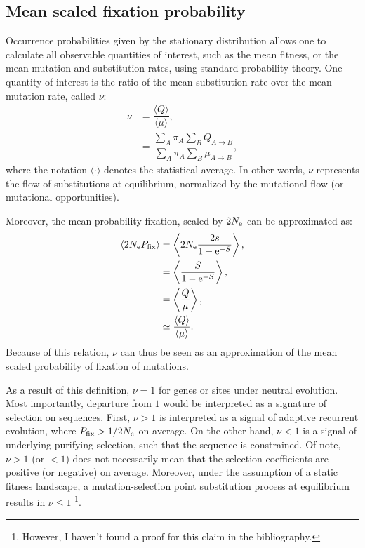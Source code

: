 \subsection{Mean scaled fixation probability}
\label{subsec:mean-scaled-fixation-probability}

Occurrence probabilities given by the stationary distribution allows one to calculate all observable quantities of interest, such as the mean fitness, or the mean mutation and \gls{substitution} rates, using standard probability theory.
One quantity of interest is the ratio of the mean \gls{substitution} rate over the mean mutation rate, called $ \nu $:
\begin{align}
    \nu & = \dfrac{ \langle Q \rangle }{\langle \mu \rangle},
    \label{eq:relative-sub-rate} \\
    & = \dfrac{ \sum\limits_{A} \pi_{A} \sum\limits_{B} Q_{A \to B}}{\sum\limits_{A} \pi_{A}  \sum\limits_{B} \mu_{A \to B}},
\end{align}
where the notation $\langle \cdot \rangle$ denotes the statistical average.
In other words, $ \nu $ represents the flow of substitutions at equilibrium, normalized by the mutational flow (or mutational opportunities).

Moreover, the mean probability fixation, scaled by $2 N_{\textrm{e}}$ can be approximated as:
\begin{align}
    \langle  2N_{\textrm{e}} P_{\mathrm{fix}} \rangle & = \left\langle 2N_{\textrm{e}} \dfrac{ 2 s }{1 - \mathrm{e}^{- S}} \right\rangle, \\
    & = \left\langle  \dfrac{ S }{1 - \mathrm{e}^{- S}} \right\rangle, \\
    & = \left\langle \dfrac{ Q }{\mu} \right\rangle, \\
    & \simeq \dfrac{ \langle Q \rangle }{\langle \mu \rangle}.
\end{align}
Because of this relation, $\nu$ can thus be seen as an approximation of the mean scaled probability of fixation of mutations.

As a result of this definition, $\nu=1$ for genes or sites under \gls{neutral} evolution.
Most importantly, departure from $1$ would be interpreted as a signature of selection on sequences.
First, $\nu>1$ is interpreted as a signal of adaptive recurrent evolution, where $P_{\mathrm{fix}} > 1/2 N_{\textrm{e}}$ on average.
On the other hand, $\nu<1$ is a signal of underlying purifying selection, such that the sequence is constrained.
Of note, $ \nu > 1$ (or $ < 1$) does not necessarily mean that the selection coefficients are positive (or negative) on average.
Moreover, under the assumption of a static fitness landscape, a mutation-selection point \gls{substitution} process at equilibrium results in $\nu \leq 1$ \footnote{However, I haven't found a proof for this claim in the bibliography.}.

